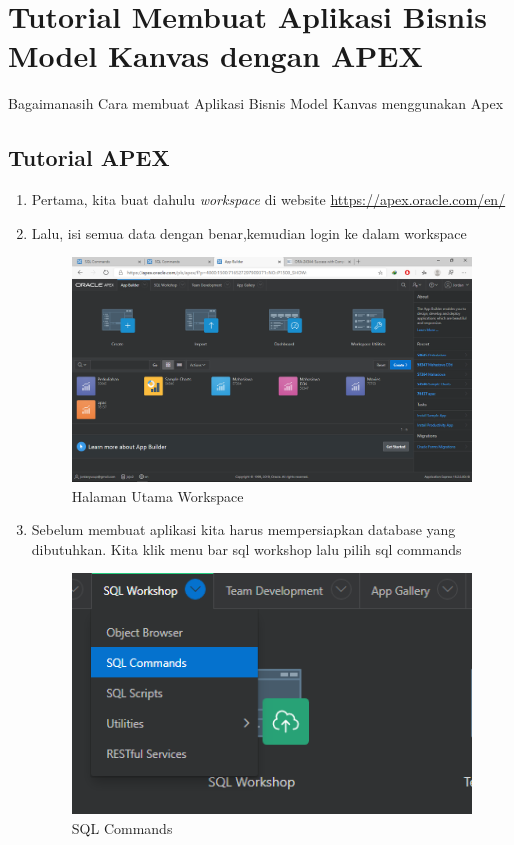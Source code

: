 \chapter{Tutorial Membuat Aplikasi Bisnis Model Kanvas dengan APEX}
Bagaimanasih Cara membuat Aplikasi Bisnis Model Kanvas menggunakan Apex

\section{Tutorial APEX}

\begin{enumerate}
\item Pertama, kita buat dahulu \textit{workspace} di website \url{https://apex.oracle.com/en/} 

\item Lalu, isi semua data dengan benar,kemudian login ke dalam workspace 
\begin{figure}[H]
\centering
\caption{Halaman Utama Workspace}
\includegraphics[width=1\textwidth]{figures/1.png}
\end{figure}

\item Sebelum membuat aplikasi kita harus mempersiapkan database yang dibutuhkan. Kita klik menu bar sql workshop lalu pilih sql commands 
\begin{figure}[H]
\centering
\caption{SQL Commands}
\includegraphics[witdh=1\textwidth]{figures/13.png}
\end{figure}


\end{enumerate}
